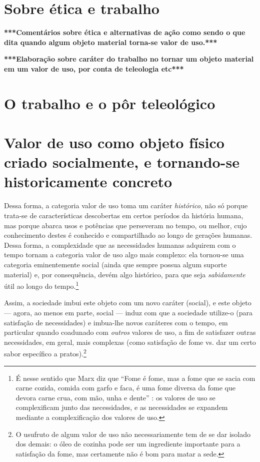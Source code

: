 \documentclass[12pt]{article}
\begin{document}
\section{Sobre ética e trabalho}
\cite{Medeiros2016}

\textbf{***Comentários sobre ética e alternativas de ação como sendo o que dita quando algum objeto material torna-se valor de uso.***}

\textbf{***Elaboração sobre caráter do trabalho no tornar um objeto material em um valor de uso, por conta de teleologia etc***}


\section{O trabalho e o pôr teleológico}




\section{Valor de uso como objeto físico criado socialmente, e tornando-se historicamente concreto}
Dessa forma, a categoria valor de uso toma um caráter \textit{histórico}, não só porque trata-se de características descobertas em certos períodos da história humana, mas porque abarca usos e potências que perseveram no tempo, ou melhor, cujo conhecimento destes é conhecido e compartilhado ao longo de gerações humanas. Dessa forma, a complexidade que as necessidades humanas adquirem com o tempo tornam a categoria valor de uso algo mais complexo: ela tornou-se uma categoria eminentemente social (ainda que sempre possua algum suporte material) e, por consequência, devém algo histórico, para que seja \textit{sabidamente} útil ao longo do tempo.\footnote{É nesse sentido que Marx diz que ``Fome é fome, mas a fome que se sacia com carne cozida, comida com garfo e faca, é uma fome diversa da fome que devora carne crua, com mão, unha e dente'' \cite[\textbf{checar página}]{Marx2021}: os valores de uso se complexificam junto das necessidades, e as necessidades se expandem mediante a complexificação dos valores de uso.}

Assim, a sociedade imbui este objeto com um novo caráter (social), e este objeto --- agora, ao menos em parte, social --- induz com que a sociedade utilize-o (para satisfação de necessidades) e imbua-lhe novos caráteres com o tempo, em particular quando coadunado com \textit{outros} valores de uso, a fim de satisfazer outras necessidades, em geral, mais complexas (como satisfação de fome vs. dar um certo sabor específico a pratos).\footnote{O usufruto de algum valor de uso não necessariamente tem de se dar isolado dos demais: o óleo de cozinha pode ser um ingrediente importante para a satisfação da fome, mas certamente não é bom para matar a sede.}
\end{document}
